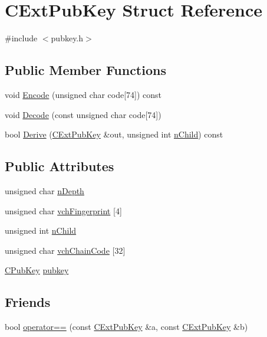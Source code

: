 \hypertarget{struct_c_ext_pub_key}{}\section{C\+Ext\+Pub\+Key Struct Reference}
\label{struct_c_ext_pub_key}


{\ttfamily \#include $<$pubkey.\+h$>$}

\subsection*{Public Member Functions}
\begin{DoxyCompactItemize}
\item 
void \hyperlink{struct_c_ext_pub_key_af197553c91c690fc436421fe00d55f8e}{Encode} (unsigned char code\mbox{[}74\mbox{]}) const 
\item 
void \hyperlink{struct_c_ext_pub_key_aa3ca44410ecfa765962d3b97aef61ab5}{Decode} (const unsigned char code\mbox{[}74\mbox{]})
\item 
bool \hyperlink{struct_c_ext_pub_key_a404798f7d800ffb539cf97431025597f}{Derive} (\hyperlink{struct_c_ext_pub_key}{C\+Ext\+Pub\+Key} \&out, unsigned int \hyperlink{struct_c_ext_pub_key_af816bc2798e9d9aaa94f56af4775d9bf}{n\+Child}) const 
\end{DoxyCompactItemize}
\subsection*{Public Attributes}
\begin{DoxyCompactItemize}
\item 
unsigned char \hyperlink{struct_c_ext_pub_key_a58a0724855654eab688cdb00738e3dba}{n\+Depth}
\item 
unsigned char \hyperlink{struct_c_ext_pub_key_a57101a84d16d7897bcec224e488143d9}{vch\+Fingerprint} \mbox{[}4\mbox{]}
\item 
unsigned int \hyperlink{struct_c_ext_pub_key_af816bc2798e9d9aaa94f56af4775d9bf}{n\+Child}
\item 
unsigned char \hyperlink{struct_c_ext_pub_key_a208836888dcc295ca1510de459ca1fc7}{vch\+Chain\+Code} \mbox{[}32\mbox{]}
\item 
\hyperlink{class_c_pub_key}{C\+Pub\+Key} \hyperlink{struct_c_ext_pub_key_ab18c8520919d20bbfd068565ae566ea8}{pubkey}
\end{DoxyCompactItemize}
\subsection*{Friends}
\begin{DoxyCompactItemize}
\item 
bool \hyperlink{struct_c_ext_pub_key_a21fdc5351d6df62ce501f57bc1e1c9e6}{operator==} (const \hyperlink{struct_c_ext_pub_key}{C\+Ext\+Pub\+Key} \&a, const \hyperlink{struct_c_ext_pub_key}{C\+Ext\+Pub\+Key} \&b)
\end{DoxyCompactItemize}



